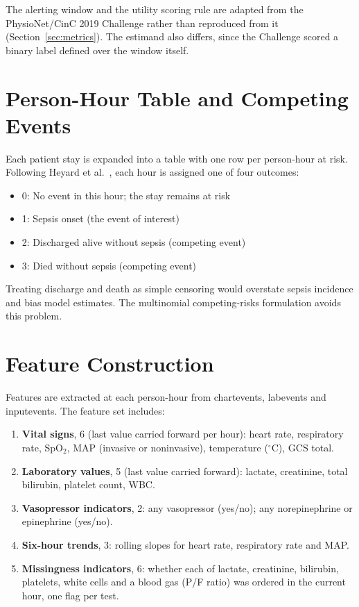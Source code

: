 The alerting window and the utility scoring rule are adapted from the
PhysioNet/CinC 2019 Challenge \cite{reyna2020utility} rather than reproduced
from it (Section~\ref{sec:metrics}). The estimand also differs, since the
Challenge scored a binary label defined over the window itself.


\section{Person-Hour Table and Competing Events}
\label{sec:person_hours}

Each patient stay is expanded into a table with one row per person-hour at
risk. Following Heyard et al.\ \cite{heyard2019dynamic}, each hour is
assigned one of four outcomes:

\begin{itemize}
    \item 0: No event in this hour; the stay remains at risk
    \item 1: Sepsis onset (the event of interest)
    \item 2: Discharged alive without sepsis (competing event)
    \item 3: Died without sepsis (competing event)
\end{itemize}

Treating discharge and death as simple censoring would overstate sepsis
incidence and bias model estimates. The multinomial competing-risks formulation
avoids this problem.


\section{Feature Construction}
\label{sec:features}

Features are extracted at each person-hour from chartevents, labevents and
inputevents. The feature set includes:

\begin{enumerate}
    \item \textbf{Vital signs}, 6 (last value carried forward per hour): heart
    rate, respiratory rate, SpO$_2$, MAP (invasive or noninvasive), temperature
    ($^\circ$C), GCS total.
    \item \textbf{Laboratory values}, 5 (last value carried forward): lactate,
    creatinine, total bilirubin, platelet count, WBC.
    \item \textbf{Vasopressor indicators}, 2: any vasopressor (yes/no); any
    norepinephrine or epinephrine (yes/no).
    \item \textbf{Six-hour trends}, 3: rolling slopes for heart rate,
    respiratory rate and MAP.
    \item \textbf{Missingness indicators}, 6: whether each of lactate,
    creatinine, bilirubin, platelets, white cells and a blood gas
    (P/F ratio) was ordered in the current hour, one flag per test.
\end{enumerate}

